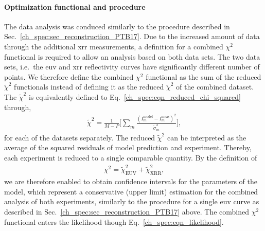 \paragraph{Optimization functional and procedure}
The data analysis was conduced similarly to the procedure described in Sec.~\ref{ch_spec:sec_reconstruction_PTB17}. Due to the increased amount of data through the additional \gls{xrr} measurements, a definition for a combined $\chi^2$ functional is required to allow an analysis based on both data sets. The two data sets, i.e.~the \gls{euv} and \gls{xrr} reflectivity curves have significantly different number of points. We therefore define the combined $\chi^2$ functional as the sum of the reduced $\tilde{\chi}^2$ functionals instead of defining it as the reduced $\tilde{\chi}^2$ of the combined dataset. The $\tilde{\chi}^2$ is equivalently defined to Eq.~\eqref{ch_spec:eqn_reduced_chi_squared} through,\begin{align}
\tilde{\chi}^2 = \frac{1}{M-P} \bigg[\sum\limits_{m} \frac{(I_m^\text{model} 
- I_m^\text{meas})^2}{\tilde{\sigma}_m^2} \bigg] \text{,}
\end{align}
for each of the datasets separately. The reduced $\tilde{\chi}^2$ can be interpreted as the average of the squared residuals of model prediction and experiment. Thereby, each experiment is reduced to a single comparable quantity. By the definition of
\begin{align}
\chi^2 = \tilde{\chi}^2_\text{EUV} +\tilde{\chi}^2_\text{XRR} \text{,}
\label{ch_spec:eqn_Mo_Si_C_total_chi_2}
\end{align}
we are therefore enabled to obtain confidence intervals for the parameters of the model, which represent a conservative (upper limit) estimation for the combined analysis of both experiments, similarly to the procedure for a single \gls{euv} curve as described in Sec.~\ref{ch_spec:sec_reconstruction_PTB17} above. The combined $\chi^2$ functional enters the likelihood though Eq.~\ref{ch_spec:eqn_likelihood}.


